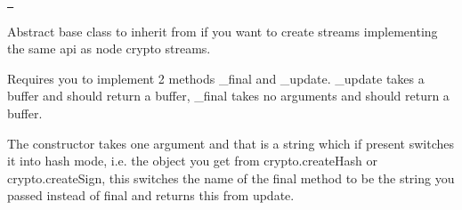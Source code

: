 \href{https://travis-ci.org/crypto-browserify/cipher-base}{\texttt{ }}

Abstract base class to inherit from if you want to create streams implementing the same api as node crypto streams.

Requires you to implement 2 methods {\ttfamily \+\_\+final} and {\ttfamily \+\_\+update}. {\ttfamily \+\_\+update} takes a buffer and should return a buffer, {\ttfamily \+\_\+final} takes no arguments and should return a buffer.

The constructor takes one argument and that is a string which if present switches it into hash mode, i.\+e. the object you get from crypto.\+create\+Hash or crypto.\+create\+Sign, this switches the name of the final method to be the string you passed instead of {\ttfamily final} and returns {\ttfamily this} from update. 